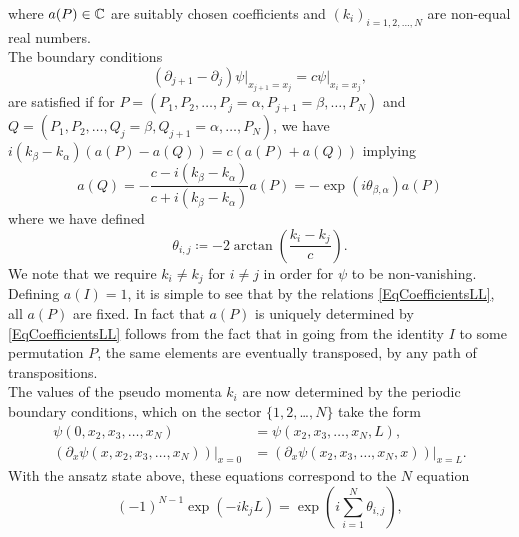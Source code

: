 where $ a(P)\in\mathbb{C} $ are suitably chosen coefficients and $(k_i)_{i=1,2,...,N}$ are non-equal real numbers.\\
The boundary conditions $$
(\partial_{j+1}-\partial_j)\psi\rvert_{x_{j+1}=x_j}=c\psi\rvert_{x_i=x_j},
$$
are satisfied if for $ P=(P_1,P_2,\ldots,P_j=\alpha,P_{j+1}=\beta,\ldots,P_N) $ and $ Q=(P_1,P_2,\ldots,Q_j=\beta,Q_{j+1}=\alpha,\ldots,P_N) $, we have $ i(k_\beta-k_\alpha)(a(P)-a(Q))=c (a(P)+a(Q)) $ implying\begin{equation}\label{EqCoefficientsLL}
	a(Q)=-\frac{c-i(k_\beta-k_\alpha)}{c+i(k_\beta-k_\alpha)}a(P)=-\exp(i\theta_{\beta,\alpha})a(P)
\end{equation} where we have defined\begin{equation}
\theta_{i,j}\coloneqq-2 \arctan\left(\frac{k_i-k_j}{c}\right).
\end{equation}
We note that we require $ k_i\neq k_j $ for $ i\neq j $ in order for $ \psi $ to be non-vanishing. Defining $ a(I)=1 $, it is simple to see that by the relations \eqref{EqCoefficientsLL}, all $ a(P) $ are fixed. In fact that $ a(P) $ is uniquely determined by \eqref{EqCoefficientsLL} follows from the fact that in going from the identity $ I $ to some permutation $ P $, the same elements are eventually transposed, by any path of transpositions.\\
The values of the pseudo momenta $ k_i $ are now determined by the periodic boundary conditions, which on the sector $ \{1,2,$\ldots$,N\} $ take the form \begin{equation}\begin{aligned}
\psi(0,x_2,x_3,\ldots,x_N)&=\psi(x_2,x_3,\ldots,x_N,L),\\
\left(\partial_x \psi(x,x_2,x_3,\ldots,x_N) \right)\big\rvert_{x=0}&=\left(\partial_x \psi(x_2,x_3,\ldots,x_N,x) \right)\big\rvert_{x=L}.
\end{aligned}
\end{equation}
With the ansatz state above, these equations correspond to the $ N $ equation\begin{equation}\label{EqLLPseudoMomenta}
	(-1)^{N-1}\exp(-i k_j L)=\exp\left(i\sum_{i=1}^{N}\theta_{i,j}\right),
\end{equation}
